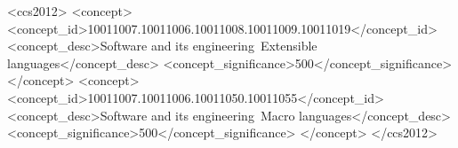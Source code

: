 \documentclass[acmsmall,screen]{acmart}
\begin{document}
\begin{abstract}


\end{abstract}


\begin{CCSXML}
<ccs2012>
<concept>
<concept_id>10011007.10011006.10011008.10011009.10011019</concept_id>
<concept_desc>Software and its engineering~Extensible languages</concept_desc>
<concept_significance>500</concept_significance>
</concept>
<concept>
<concept_id>10011007.10011006.10011050.10011055</concept_id>
<concept_desc>Software and its engineering~Macro languages</concept_desc>
<concept_significance>500</concept_significance>
</concept>
</ccs2012>
\end{CCSXML}





\maketitle
\end{document}
